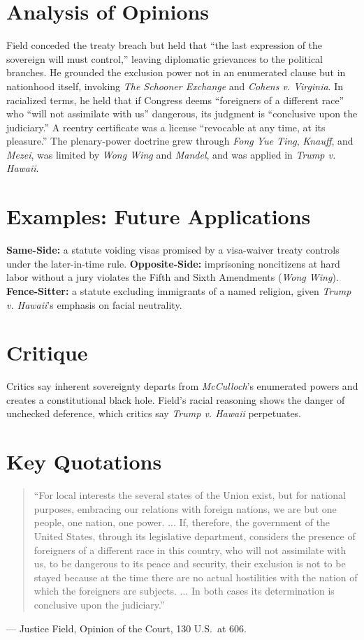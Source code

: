 \documentclass[12pt]{article}
\begin{document}
\section{Analysis of Opinions}
Field conceded the treaty breach but held that ``the last expression of the sovereign will must control,'' leaving diplomatic grievances to the political branches. He grounded the exclusion power not in an enumerated clause but in nationhood itself, invoking \textit{The Schooner Exchange} and \textit{Cohens v. Virginia}. In racialized terms, he held that if Congress deems ``foreigners of a different race'' who ``will not assimilate with us'' dangerous, its judgment is ``conclusive upon the judiciary.'' A reentry certificate was a license ``revocable at any time, at its pleasure.'' The plenary-power doctrine grew through \textit{Fong Yue Ting}, \textit{Knauff}, and \textit{Mezei}, was limited by \textit{Wong Wing} and \textit{Mandel}, and was applied in \textit{Trump v. Hawaii}.

\section{Examples: Future Applications}
\textbf{Same-Side:} a statute voiding visas promised by a visa-waiver treaty controls under the later-in-time rule. \textbf{Opposite-Side:} imprisoning noncitizens at hard labor without a jury violates the Fifth and Sixth Amendments (\textit{Wong Wing}). \textbf{Fence-Sitter:} a statute excluding immigrants of a named religion, given \textit{Trump v. Hawaii}'s emphasis on facial neutrality.

\section{Critique}
Critics say inherent sovereignty departs from \textit{McCulloch}'s enumerated powers and creates a constitutional black hole. Field's racial reasoning shows the danger of unchecked deference, which critics say \textit{Trump v. Hawaii} perpetuates.

\section{Key Quotations}
\begin{quote}
``For local interests the several states of the Union exist, but for national purposes, embracing our relations with foreign nations, we are but one people, one nation, one power. ... If, therefore, the government of the United States, through its legislative department, considers the presence of foreigners of a different race in this country, who will not assimilate with us, to be dangerous to its peace and security, their exclusion is not to be stayed because at the time there are no actual hostilities with the nation of which the foreigners are subjects. ... In both cases its determination is conclusive upon the judiciary.''
\end{quote}
\noindent --- Justice Field, Opinion of the Court, 130 U.S.\ at 606.
\end{document}
